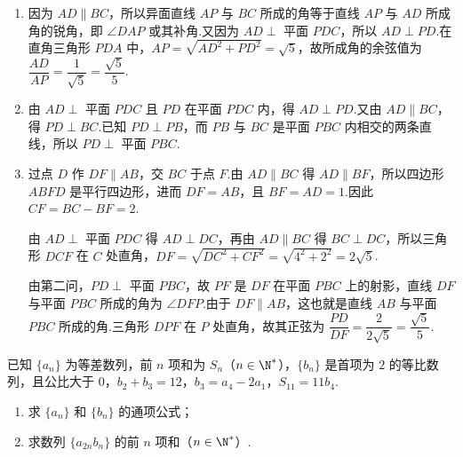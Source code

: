 \begin{solution}
\begin{enumerate}
\item 因为 \(AD\parallel BC\)，所以异面直线 \(AP\) 与 \(BC\) 所成的角等于直线 \(AP\) 与 \(AD\) 所成角的锐角，即 \(\angle DAP\) 或其补角.又因为 \(AD\perp\) 平面 \(PDC\)，所以 \(AD\perp PD\).在直角三角形 \(PDA\) 中，\(AP=\sqrt{AD^2+PD^2}=\sqrt5\)，故所成角的余弦值为 \(\dfrac{AD}{AP}=\dfrac1{\sqrt5}=\dfrac{\sqrt5}{5}\).

\item 由 \(AD\perp\) 平面 \(PDC\) 且 \(PD\) 在平面 \(PDC\) 内，得 \(AD\perp PD\).又由 \(AD\parallel BC\)，得 \(PD\perp BC\).已知 \(PD\perp PB\)，而 \(PB\) 与 \(BC\) 是平面 \(PBC\) 内相交的两条直线，所以 \(PD\perp\) 平面 \(PBC\).

\item 过点 \(D\) 作 \(DF\parallel AB\)，交 \(BC\) 于点 \(F\).由 \(AD\parallel BC\) 得 \(AD\parallel BF\)，所以四边形 \(ABFD\) 是平行四边形，进而 \(DF=AB\)，且 \(BF=AD=1\).因此 \(CF=BC-BF=2\).

由 \(AD\perp\) 平面 \(PDC\) 得 \(AD\perp DC\)，再由 \(AD\parallel BC\) 得 \(BC\perp DC\)，所以三角形 \(DCF\) 在 \(C\) 处直角，\(DF=\sqrt{DC^2+CF^2}=\sqrt{4^2+2^2}=2\sqrt5\).

由第二问，\(PD\perp\) 平面 \(PBC\)，故 \(PF\) 是 \(DF\) 在平面 \(PBC\) 上的射影，直线 \(DF\) 与平面 \(PBC\) 所成的角为 \(\angle DFP\).由于 \(DF\parallel AB\)，这也就是直线 \(AB\) 与平面 \(PBC\) 所成的角.三角形 \(DPF\) 在 \(P\) 处直角，故其正弦为 \(\dfrac{PD}{DF}=\dfrac2{2\sqrt5}=\dfrac{\sqrt5}{5}\).
\end{enumerate}
\end{solution}

\begin{problem}
已知 \(\{a_n\}\) 为等差数列，前 \(n\) 项和为 \(S_n\)（\(n\in\N^*\)），\(\{b_n\}\) 是首项为 \(2\) 的等比数列，且公比大于 \(0\)，\(b_2+b_3=12\)，\(b_3=a_4-2a_1\)，\(S_{11}=11b_4\).

\begin{enumerate}
\item 求 \(\{a_n\}\) 和 \(\{b_n\}\) 的通项公式；
\item 求数列 \(\{a_{2n}b_n\}\) 的前 \(n\) 项和（\(n\in\N^*\)）.
\end{enumerate}
\end{problem}


